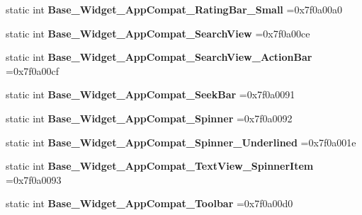 \begin{DoxyCompactItemize}
static int {\bfseries Base\+\_\+\+Widget\+\_\+\+App\+Compat\+\_\+\+Rating\+Bar\+\_\+\+Small} =0x7f0a00a0
\item 
\mbox{\label{classandroid_1_1support_1_1v7_1_1cardview_1_1R_1_1style_ad3db9a5058e8f2e9e56c641918df6494}} 
static int {\bfseries Base\+\_\+\+Widget\+\_\+\+App\+Compat\+\_\+\+Search\+View} =0x7f0a00ce
\item 
\mbox{\label{classandroid_1_1support_1_1v7_1_1cardview_1_1R_1_1style_a78d30ef541001161a8ffacc926a7c554}} 
static int {\bfseries Base\+\_\+\+Widget\+\_\+\+App\+Compat\+\_\+\+Search\+View\+\_\+\+Action\+Bar} =0x7f0a00cf
\item 
\mbox{\label{classandroid_1_1support_1_1v7_1_1cardview_1_1R_1_1style_a15a784d191d20c8e0468804ce407b961}} 
static int {\bfseries Base\+\_\+\+Widget\+\_\+\+App\+Compat\+\_\+\+Seek\+Bar} =0x7f0a0091
\item 
\mbox{\label{classandroid_1_1support_1_1v7_1_1cardview_1_1R_1_1style_a11a2f310d9d8f30ce3875742027edd72}} 
static int {\bfseries Base\+\_\+\+Widget\+\_\+\+App\+Compat\+\_\+\+Spinner} =0x7f0a0092
\item 
\mbox{\label{classandroid_1_1support_1_1v7_1_1cardview_1_1R_1_1style_acf610997f21e6e4e21a6993cd513d87a}} 
static int {\bfseries Base\+\_\+\+Widget\+\_\+\+App\+Compat\+\_\+\+Spinner\+\_\+\+Underlined} =0x7f0a001e
\item 
\mbox{\label{classandroid_1_1support_1_1v7_1_1cardview_1_1R_1_1style_af355ac1435095a8516c236be1b21de0b}} 
static int {\bfseries Base\+\_\+\+Widget\+\_\+\+App\+Compat\+\_\+\+Text\+View\+\_\+\+Spinner\+Item} =0x7f0a0093
\item 
\mbox{\label{classandroid_1_1support_1_1v7_1_1cardview_1_1R_1_1style_a335798cb7d6e65b12b15ad21c8654f43}} 
static int {\bfseries Base\+\_\+\+Widget\+\_\+\+App\+Compat\+\_\+\+Toolbar} =0x7f0a00d0
\item 

\end{DoxyCompactItemize}
